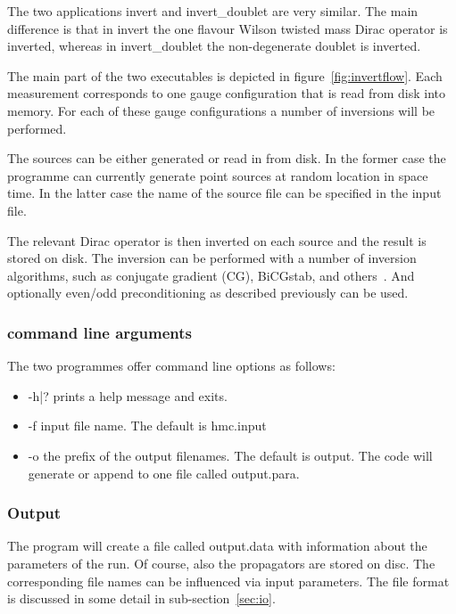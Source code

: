 The two applications {\ttfamily invert} and {\ttfamily
  invert\_doublet} are very similar. The main difference is that in
{\ttfamily invert} the one flavour Wilson twisted mass Dirac operator
is inverted, whereas in {\ttfamily invert\_doublet} the non-degenerate
doublet is inverted. 

The main part of the two executables is depicted in
figure~\ref{fig:invertflow}. Each measurement corresponds to one gauge
configuration that is read from disk into memory. For each of these
gauge configurations a number of inversions will be performed. 

The sources can be either generated or read in from disk. In
the former case the programme can currently generate point sources at
random location in space time. In the latter case the name of the
source file can be specified in the input file. 

The relevant Dirac operator is then inverted on each source and the
result is stored on disk. The inversion can be performed with a number
of inversion algorithms, such as conjugate gradient (CG), BiCGstab,
and others~\cite{saad:2003a}. And optionally even/odd preconditioning
as described previously can be used. 

\subsubsection{command line arguments}

The two programmes offer command line options as follows:
\begin{itemize}
\item {\ttfamily -h|?} prints a help message and exits.
\item {\ttfamily -f} input file name. The default is {\ttfamily
    hmc.input}
\item {\ttfamily -o} the prefix of the output filenames. The default is
  {\ttfamily output}. The code will generate or append to one file
  called {\ttfamily output.para}.
\end{itemize}

\subsubsection{Output}

The program will create a file called {\ttfamily output.data} with
information about the parameters of the run. 
Of course, also the propagators are stored on disc. The corresponding
file names can be influenced via input parameters. The file format
is discussed in some detail in sub-section~\ref{sec:io}.

